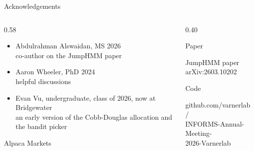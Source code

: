 \begin{frame}{Acknowledgements}
  \vspace{0.6em}
  \begin{columns}[T,onlytextwidth]
    \begin{column}{0.58\textwidth}
      \begin{itemize}
        \setlength{\itemsep}{0.7em}
        \item {\vnmedium Abdulrahman Alswaidan}, MS 2026\\
          {\small co-author on the JumpHMM paper}
        \item {\vnmedium Aaron Wheeler}, PhD 2024\\
          {\small helpful discussions}
        \item {\vnmedium Evan Vu}, undergraduate, class of 2026, now at Bridgewater\\
          {\small an early version of the Cobb-Douglas allocation and the bandit picker}
      \end{itemize}
      \vspace{1.2em}
      Alpaca Markets
    \end{column}
    \begin{column}{0.40\textwidth}
      \centering
      \hypersetup{urlcolor=black}
      \begin{minipage}[t]{0.47\linewidth}
        \centering
        {\small\vnmedium Paper}\par\vspace{0.4em}
        \par\vspace{0.4em}
        {\tiny JumpHMM paper\\arXiv:2603.10202\par}
      \end{minipage}\hfill
      \begin{minipage}[t]{0.47\linewidth}
        \centering
        {\small\vnmedium Code}\par\vspace{0.4em}
        \par\vspace{0.4em}
        {\tiny github.com/varnerlab/\\INFORMS-Annual-Meeting-\\2026-Varnerlab\par}
      \end{minipage}
    \end{column}
  \end{columns}
\end{frame}
